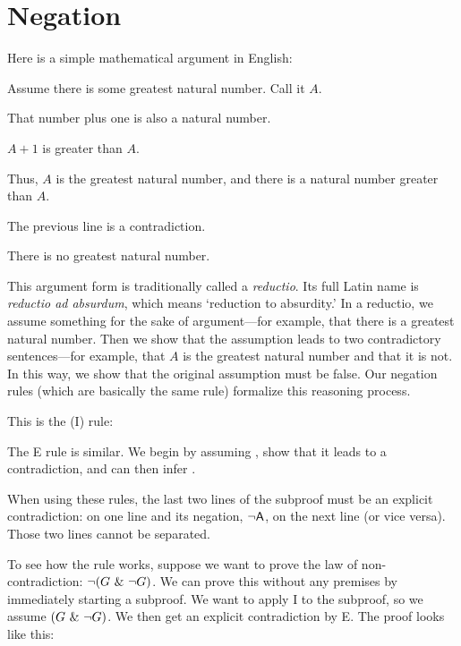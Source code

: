 \section{Negation}
Here is a simple mathematical argument in English:
\begin{earg}
\item[] Assume there is some greatest natural number. Call it $A$.
\item[] That number plus one is also a natural number.
\item[] $A+1$ is greater than $A$.
\item[] Thus, $A$ is the greatest natural number, and there is a natural number greater than $A$.
\item[] The previous line is a contradiction.
\item[\therefore] There is no greatest natural number.
\end{earg}
This argument form is traditionally called a \emph{reductio}. Its full Latin name is \emph{reductio ad absurdum}, which means `reduction to absurdity.' In a reductio, we assume something for the sake of argument---for example, that there is a greatest natural number. Then we show that the assumption leads to two contradictory sentences---for example, that $A$ is the greatest natural number and that it is not. In this way, we show that the original assumption must be false. Our negation rules (which are basically the same rule) formalize this reasoning process.

This is the  ({\enot}I) rule:

The {\enot}E rule is similar. We begin by assuming \enot{}, show that it leads to a contradiction, and can then infer . 

When using these rules, the last two lines of the subproof must be an explicit contradiction:  on one line and its negation, ${\neg}\mathsf{A}$, on the next line (or vice versa). Those two lines cannot be separated. 

To see how the rule works, suppose we want to prove the law of non-contradiction: ${\neg}(G ~\&~ {\neg} G)$. We can prove this without any premises by immediately starting a subproof. We want to apply {\enot}I to the subproof, so we assume $(G ~\&~ {\neg} G)$. We then get an explicit contradiction by {\eand}E. The proof looks like this:

